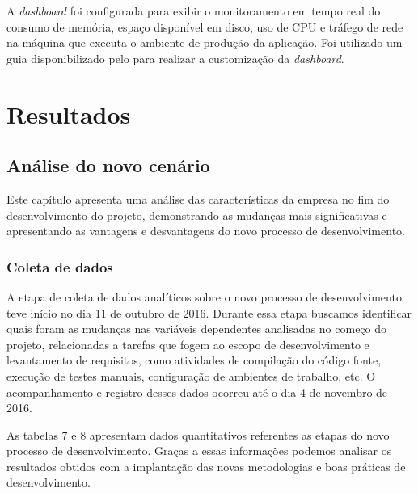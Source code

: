 \documentclass[
	12pt,				%
	openright,			%
	oneside,			%
	a4paper,			%
	english,			%
	french,				%
	spanish,			%
	brazil,				%
	]{abntex2}
\begin{document}
A \textit{dashboard} foi configurada para exibir o monitoramento em tempo real do consumo de memória, espaço disponível em disco, uso de CPU e tráfego de rede na máquina que executa o ambiente de produção da aplicação. Foi utilizado um guia disponibilizado pelo  para realizar a customização da \textit{dashboard}.





\part{Resultados}

\chapter{Análise do novo cenário}

Este capítulo apresenta uma análise das características da empresa no fim do desenvolvimento do projeto, demonstrando as mudanças mais significativas e apresentando as vantagens e desvantagens do novo processo de desenvolvimento.

\section{Coleta de dados}

A etapa de coleta de dados analíticos sobre o novo processo de desenvolvimento teve início no dia 11 de outubro de 2016. Durante essa etapa buscamos identificar quais foram as mudanças nas variáveis dependentes analisadas no começo do projeto, relacionadas a tarefas que fogem ao escopo de desenvolvimento e levantamento de requisitos, como atividades de compilação do código fonte, execução de testes manuais, configuração de ambientes de trabalho, etc. O acompanhamento e registro desses dados ocorreu até o dia 4 de novembro de 2016.

As tabelas 7 e 8 apresentam dados quantitativos referentes as etapas do novo processo de desenvolvimento. Graças a essas informações podemos analisar os resultados obtidos com a implantação das novas metodologias e boas práticas de desenvolvimento.
\end{document}
